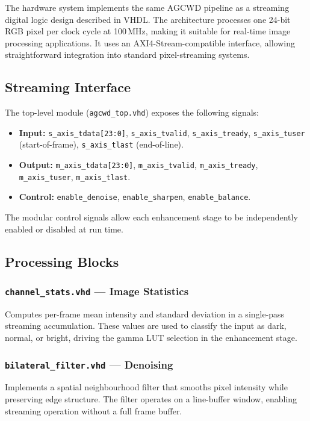 \documentclass[conference]{IEEEtran}
\begin{document}
The hardware system implements the same AGCWD pipeline as a streaming digital logic design described in VHDL. The architecture processes one 24-bit RGB pixel per clock cycle at 100\,MHz, making it suitable for real-time image processing applications. It uses an AXI4-Stream-compatible interface, allowing straightforward integration into standard pixel-streaming systems.

\subsection{Streaming Interface}

The top-level module (\texttt{agcwd\_top.vhd}) exposes the following signals:
\begin{itemize}
  \item \textbf{Input:} \texttt{s\_axis\_tdata[23:0]}, \texttt{s\_axis\_tvalid}, \texttt{s\_axis\_tready}, \texttt{s\_axis\_tuser} (start-of-frame), \texttt{s\_axis\_tlast} (end-of-line).
  \item \textbf{Output:} \texttt{m\_axis\_tdata[23:0]}, \texttt{m\_axis\_tvalid}, \texttt{m\_axis\_tready}, \texttt{m\_axis\_tuser}, \texttt{m\_axis\_tlast}.
  \item \textbf{Control:} \texttt{enable\_denoise}, \texttt{enable\_sharpen}, \texttt{enable\_balance}.
\end{itemize}

The modular control signals allow each enhancement stage to be independently enabled or disabled at run time.

\subsection{Processing Blocks}

\subsubsection{\texttt{channel\_stats.vhd} — Image Statistics}
Computes per-frame mean intensity and standard deviation in a single-pass streaming accumulation. These values are used to classify the input as dark, normal, or bright, driving the gamma LUT selection in the enhancement stage.

\subsubsection{\texttt{bilateral\_filter.vhd} — Denoising}
Implements a spatial neighbourhood filter that smooths pixel intensity while preserving edge structure. The filter operates on a line-buffer window, enabling streaming operation without a full frame buffer.
\end{document}
